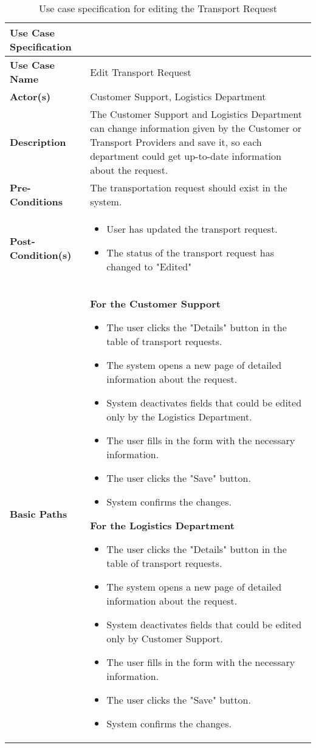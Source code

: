 \documentclass[a4paper]{article}
\begin{document}
    
      \begin{longtable}{|p{}|p{}|}
        \caption{Use case specification for editing the Transport Request}
        \label{editingTheTansportRequestUseCase} \\
        \hline
        Use Case Specification  &  \\
         \hline
         \endhead
         \textbf{Use Case Name} & Edit Transport Request \\
         \hline
         \textbf{Actor(s)} & Customer Support, Logistics Department \\
         \hline
         \textbf{Description} & The Customer Support and Logistics Department can change information given by the Customer or Transport Providers and save it, so each department could get up-to-date information about the request.   \\
         \hline
         \textbf{Pre-Conditions} & The transportation request should exist in the system. \\
         \hline
        \textbf{Post-Condition(s)} & 
        \begin{itemize}
            \item User has updated the transport request.
            \item The status of the transport request has changed to "Edited"
        \end{itemize} \\
         \hline
         \textbf{Basic Paths} & \textbf{For the Customer Support}
         \begin{itemize}
             \item The user clicks the "Details" button in the table of transport requests. 
             \item The system opens a new page of detailed information about the request.
             \item System deactivates fields that could be edited only by the Logistics Department.
             \item The user fills in the form with the necessary information.
             \item The user clicks the "Save" button.
             \item System confirms the changes.
         \end{itemize} 
         \textbf{For the Logistics Department}
         \begin{itemize}
             \item The user clicks the "Details" button in the table of transport requests.
             \item The system opens a new page of detailed information about the request.
             \item System deactivates fields that could be edited only by Customer Support.
             \item The user fills in the form with the necessary information.
             \item The user clicks the "Save" button.
             \item System confirms the changes.
         \end{itemize} \\
         

\end{longtable}
\end{document}
